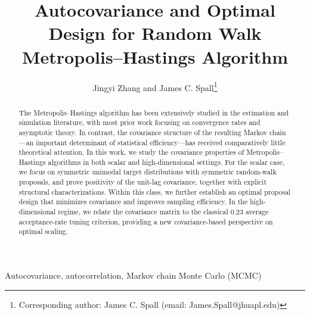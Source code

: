 \documentclass[conference]{IEEEtran}
\theoremstyle{definition}
\begin{document}
\title{\LARGE \textbf{Autocovariance and Optimal Design for Random Walk Metropolis--Hastings Algorithm}}
\IEEEoverridecommandlockouts


\author{
  Jingyi Zhang and
  James C. Spall\thanks{Corresponding author: James C. Spall (email: James.Spall@jhuapl.edu)}
}

\maketitle

\begin{abstract}
The Metropolis–Hastings algorithm has been extensively studied in the estimation and simulation literature, with most prior work focusing on convergence rates and asymptotic theory. In contrast, the covariance structure of the resulting Markov chain—an important determinant of statistical efficiency—has received comparatively little theoretical attention. In this work, we study the covariance properties of Metropolis–Hastings algorithms in both scalar and high-dimensional settings. For the scalar case, we focus on symmetric unimodal target distributions with symmetric random-walk proposals, and prove positivity of the unit-lag covariance, together with explicit structural characterizations. Within this class, we further establish an optimal proposal design that minimizes covariance and improves sampling efficiency. In the high-dimensional regime, we relate the covariance matrix to the classical 0.23 average acceptance-rate tuning criterion, providing a new covariance-based perspective on optimal scaling.
\end{abstract}

\begin{IEEEkeywords}
Autocovariance, autocorrelation, Markov chain Monte Carlo (MCMC)
\end{IEEEkeywords}
\IEEEoverridecommandlockouts
\IEEEpeerreviewmaketitle
\end{document}
